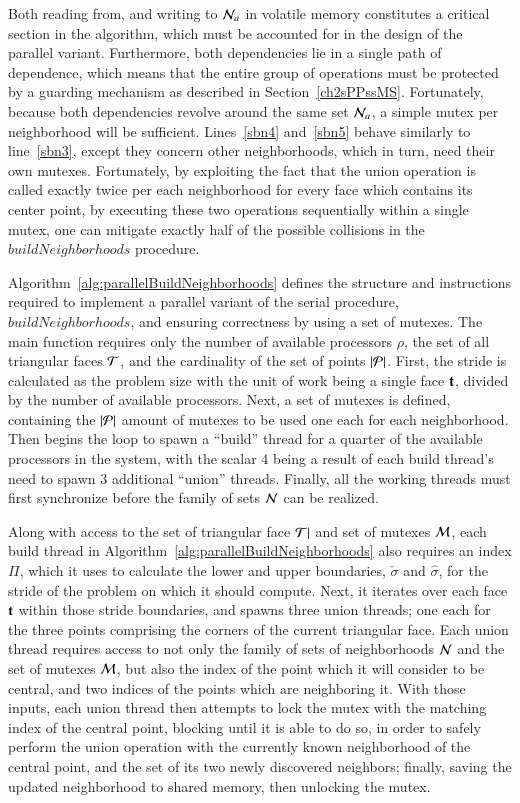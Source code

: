 Both reading from, and writing to $\mathcal{N}_a$ in volatile memory constitutes a critical section in the algorithm, which must be accounted for in the design of the parallel variant. Furthermore, both dependencies lie in a single path of dependence, which means that the entire group of operations must be protected by a guarding mechanism as described in Section~\ref{ch2sPPssMS}. Fortunately, because both dependencies revolve around the same set $\mathcal{N}_a$, a simple mutex per neighborhood will be sufficient. Lines~\ref{sbn4} and~\ref{sbn5} behave similarly to line~\ref{sbn3}, except they concern other neighborhoods, which in turn, need their own mutexes. Fortunately, by exploiting the fact that the union operation is called exactly twice per each neighborhood for every face which contains its center point, by executing these two operations sequentially within a single mutex, one can mitigate exactly half of the possible collisions in the $\mathit{buildNeighborhoods}$ procedure.

Algorithm~\ref{alg:parallelBuildNeighborhoods} defines the structure and instructions required to implement a parallel variant of the serial procedure, $\mathit{buildNeighborhoods}$, and ensuring correctness by using a set of mutexes. The main function requires only the number of available processors $\rho$, the set of all triangular faces $\mathcal{T}$, and the cardinality of the set of points $|\mathcal{P}|$. First, the stride is calculated as the problem size with the unit of work being a single face $\mathbf{t}$, divided by the number of available processors. Next, a set of mutexes is defined, containing the $|\mathcal{P}|$ amount of mutexes to be used one each for each neighborhood.  Then begins the loop to spawn a ``build'' thread for a quarter of the available processors in the system, with the scalar 4 being a result of each build thread's need to spawn 3 additional ``union'' threads. Finally, all the working threads must first synchronize before the family of sets $\mathcal{N}$ can be realized.

Along with access to the set of triangular face $\mathcal{T}|$ and set of mutexes $\mathcal{M}$, each build thread in Algorithm~\ref{alg:parallelBuildNeighborhoods} also requires an index $\Pi$, which it uses to calculate the lower and upper boundaries, $\check{\sigma}$ and $\hat{\sigma}$, for the stride of the problem on which it should compute. Next, it iterates over each face $\mathbf{t}$ within those stride boundaries, and spawns three union threads; one each for the three points comprising the corners of the current triangular face. Each union thread requires access to not only the family of sets of neighborhoods $\mathcal{N}$ and the set of mutexes $\mathcal{M}$, but also the index of the point which it will consider to be central, and two indices of the points which are neighboring it. With those inputs, each union thread then attempts to lock the mutex with the matching index of the central point, blocking until it is able to do so, in order to safely perform the union operation with the currently known neighborhood of the central point, and the set of its two newly discovered neighbors; finally, saving the updated neighborhood to shared memory, then unlocking the mutex.

